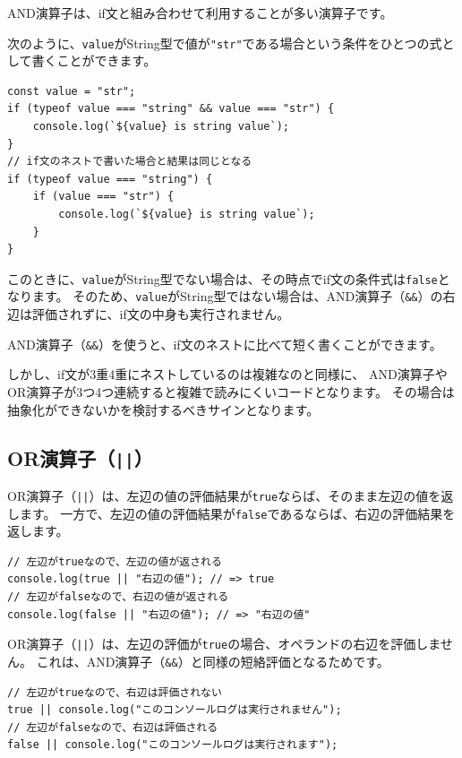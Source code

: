 AND演算子は、if文と組み合わせて利用することが多い演算子です。

次のように、\texttt{value}がString型で\textbf{}値が\texttt{"str"}である場合という条件をひとつの式として書くことができます。

\begin{lstlisting}
const value = "str";
if (typeof value === "string" && value === "str") {
    console.log(`${value} is string value`);
}
// if文のネストで書いた場合と結果は同じとなる
if (typeof value === "string") {
    if (value === "str") {
        console.log(`${value} is string value`);
    }
}
\end{lstlisting}

このときに、\texttt{value}がString型でない場合は、その時点でif文の条件式は\texttt{false}となります。
そのため、\texttt{value}がString型ではない場合は、AND演算子（\texttt{\&\&}）の右辺は評価されずに、if文の中身も実行されません。

AND演算子（\texttt{\&\&}）を使うと、if文のネストに比べて短く書くことができます。

しかし、if文が3重4重にネストしているのは複雑なのと同様に、
AND演算子やOR演算子が3つ4つ連続すると複雑で読みにくいコードとなります。
その場合は抽象化ができないかを検討するべきサインとなります。

\hypertarget{or-operator}{%
\subsection{OR演算子（\texttt{||}）}\label{or-operator}}

OR演算子（\texttt{||}）は、左辺の値の評価結果が\texttt{true}ならば、そのまま左辺の値を返します。
一方で、左辺の値の評価結果が\texttt{false}であるならば、右辺の評価結果を返します。

\begin{lstlisting}
// 左辺がtrueなので、左辺の値が返される
console.log(true || "右辺の値"); // => true
// 左辺がfalseなので、右辺の値が返される
console.log(false || "右辺の値"); // => "右辺の値"
\end{lstlisting}

OR演算子（\texttt{||}）は、左辺の評価が\texttt{true}の場合、オペランドの右辺を評価しません。
これは、AND演算子（\texttt{\&\&}）と同様の短絡評価となるためです。

\begin{lstlisting}
// 左辺がtrueなので、右辺は評価されない
true || console.log("このコンソールログは実行されません");
// 左辺がfalseなので、右辺は評価される
false || console.log("このコンソールログは実行されます");
\end{lstlisting}

